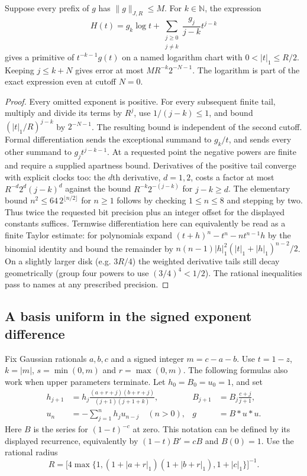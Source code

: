 \begin{lemma}
\label{lem:res-primitive}
Suppose every prefix of $g$ has $\|g\|_{J,R}\le M$. For $k\in\mathbb N$,
the expression
\[
 H(t)=g_k\log t+
 \sum_{\substack{j\ge0\\j\ne k}}
       \frac{g_j}{j-k}t^{j-k}
\]
gives a primitive of $t^{-k-1}g(t)$ on a named logarithm chart with
$0<|t|_1\le R/2$. Keeping $j\le k+N$ gives error at most
$MR^{-k}2^{-N-1}$. The logarithm is part of the exact expression even at
cutoff $N=0$.
\end{lemma}
\begin{proof}
Every omitted exponent is positive. For every subsequent finite tail,
multiply and divide its terms by $R^j$, use $1/(j-k)\le1$, and bound
$(|t|_1/R)^{j-k}$ by $2^{-N-1}$. The resulting bound is independent of
the second cutoff. Formal differentiation sends the exceptional summand to
$g_k/t$, and sends every other summand to $g_jt^{j-k-1}$. At a requested
point the negative powers are finite and require a supplied apartness
bound. Derivatives of the positive tail converge with explicit clocks too:
the $d$th derivative, $d=1,2$, costs a factor at most
$R^{-d}2^d(j-k)^d$ against the bound $R^{-k}2^{-(j-k)}$ for
$j-k\ge d$. The elementary bound $n^2\le 64\,2^{\lfloor n/2\rfloor}$
for $n\ge1$ follows by checking $1\le n\le8$ and stepping by two.
Thus twice the requested bit precision plus an integer offset for the
displayed constants suffices. Termwise differentiation here can equivalently
be read as a finite Taylor estimate: for polynomials expand
$(t+h)^n-t^n-n t^{n-1}h$ by the binomial identity and bound the remainder
by $n(n-1)|h|_1^2(|t|_1+|h|_1)^{n-2}/2$. On a slightly larger disk
(e.g. $3R/4$) the weighted derivative tails still decay geometrically
(group four powers to use $(3/4)^4<1/2$). The rational inequalities pass
to names at any prescribed precision.
\end{proof}

\subsection{A basis uniform in the signed exponent difference}

Fix Gaussian rationals $a,b,c$ and a signed integer $m=c-a-b$. Use
$t=1-z$, $k=|m|$, $s=\min(0,m)$ and $r=\max(0,m)$. The following formulas
also work when upper parameters terminate. Let $h_0=B_0=u_0=1$, and set
\[
\begin{aligned}
 h_{j+1}&=h_j\frac{(a+r+j)(b+r+j)}{(j+1)(j+1+k)},&
 B_{j+1}&=B_j\frac{c+j}{j+1},\\
 u_n&=-\sum_{j=1}^n h_j u_{n-j}\quad(n>0),&
 g&=B*u*u .
\end{aligned}
\]
Here $B$ is the series for $(1-t)^{-c}$ at zero. This notation can be
defined by its displayed recurrence, equivalently by $(1-t)B'=cB$ and
$B(0)=1$. Use the rational radius
\[
 R=\big[4\max\{1,(1+|a+r|_1)(1+|b+r|_1),1+|c|_1\}\big]^{-1}.
\]

